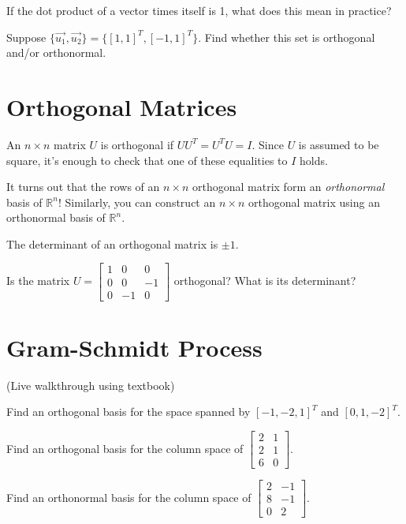 \documentclass[11pt]{exam}
\begin{document}
    \vspace{20px}
    \begin{questions}
        \item If the dot product of a vector times itself is 1, what does this mean in practice?
        \item Suppose $\{ \vec{u_1}, \vec{u_2} \} = \{ [1,1]^T, [-1, 1]^T \}$. Find whether this set is orthogonal and/or orthonormal.
    \end{questions}
    

\pagebreak
\section{Orthogonal Matrices}
    
    \vspace{20px}
    An $n \times n$ matrix $U$ is orthogonal if $U U^T = U^T U = I$. Since $U$ is assumed to be square, it's enough to check that one of these
    equalities to $I$ holds.

    It turns out that the rows of an $n \times n$ orthogonal matrix form an \textit{orthonormal} basis of $\mathbb{R}^n$! Similarly, you can construct
    an $n \times n$ orthogonal matrix using an orthonormal basis of $\mathbb{R}^n$.

    The determinant of an orthogonal matrix is $\pm 1$.

    \vspace{20px}
    \begin{questions}
        \item Is the matrix $U = \begin{bmatrix} 1 & 0 & 0 \\ 0 & 0 & -1 \\ 0 & -1 & 0 \end{bmatrix}$ orthogonal? What is its determinant?
    \end{questions}

\pagebreak
\section{Gram-Schmidt Process}
    \vspace{20px}
    (Live walkthrough using textbook)

    \vspace{20px}
    \begin{questions}
        \item Find an orthogonal basis for the space spanned by $[-1, -2, 1]^T$ and $[0,1,-2]^T$.
        \item Find an orthogonal basis for the column space of $\begin{bmatrix} 2 & 1 \\ 2 & 1 \\ 6 & 0 \end{bmatrix}$.
        \item Find an orthonormal basis for the column space of $\begin{bmatrix} 2 & -1 \\ 8 & -1 \\ 0 & 2 \end{bmatrix}$.
    \end{questions}
\end{document}
